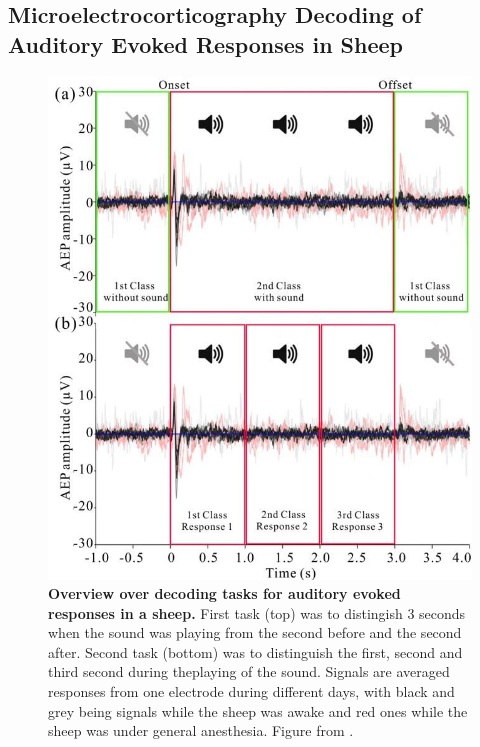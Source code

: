 \subsection{Microelectrocorticography Decoding of Auditory Evoked
Responses in
Sheep}\label{microelectrocorticography-decoding-of-auditory-evoked-responses-in-sheep}

\begin{figure}[htb]
    \myfloatalign
    \includegraphics[width=0.65\linewidth]{images/sheep-sounds.jpg}
    \caption[Overview over decoding tasks for
auditory evoked responses in a sheep]{
\textbf{Overview over decoding tasks for
auditory evoked responses in a sheep.} First task (top) was to
distingish 3 seconds when the sound was playing from the second before
and the second after. Second task (bottom) was to distinguish the first,
second and third second during theplaying of the sound. Signals are
averaged responses from one electrode during different days, with black
and grey being signals while the sheep was awake and red ones while the
sheep was under general anesthesia. Figure from \citet{wangsheep}.
}
\label{sheep-sounds-fig}
\end{figure}


